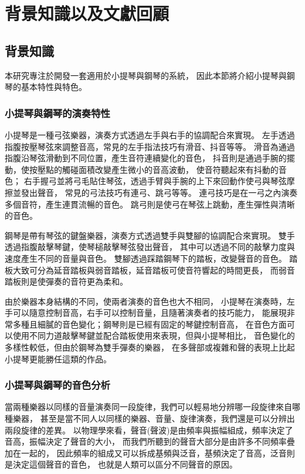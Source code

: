 \documentclass[class=NCU_thesis, crop=false]{standalone}
\begin{document}
\chapter{背景知識以及文獻回顧}

\section{背景知識}
本研究專注於開發一套適用於小提琴與鋼琴的系統，
因此本節將介紹小提琴與鋼琴的基本特性與特色。

\subsection{小提琴與鋼琴的演奏特性} \label{ch2-subst-performace-timbre-analysis}
小提琴是一種弓弦樂器，演奏方式透過左手與右手的協調配合來實現。
左手透過指腹按壓琴弦來調整音高，常見的左手指法技巧有滑音、抖音等等。
滑音為通過指腹沿琴弦滑動到不同位置，產生音符連續變化的音色，
抖音則是通過手腕的擺動，使按壓點的觸碰面積改變產生微小的音高波動，
使音符聽起來有抖動的音色；
右手握弓並將弓毛貼住琴弦，透過手臂與手腕的上下來回動作使弓與琴弦摩擦並發出聲音，
常見的弓法技巧有連弓、跳弓等等。
連弓技巧是在一弓之內演奏多個音符，產生連貫流暢的音色。
跳弓則是使弓在琴弦上跳動，產生彈性與清晰的音色。

鋼琴是帶有琴弦的鍵盤樂器，演奏方式透過雙手與雙腳的協調配合來實現。
雙手透過指腹敲擊琴鍵，使琴槌敲擊琴弦發出聲音，
其中可以透過不同的敲擊力度與速度產生不同的音量與音色。
雙腳透過踩踏鋼琴下的踏板，改變聲音的音色。
踏板大致可分為延音踏板與弱音踏板，延音踏板可使音符響起的時間更長，
而弱音踏板則是使彈奏的音符更為柔和。

由於樂器本身結構的不同，使兩者演奏的音色也大不相同，
小提琴在演奏時，左手可以隨意控制音高，右手可以控制音量，且隨著演奏者的技巧能力，
能展現非常多種且細膩的音色變化；鋼琴則是已經有固定的琴鍵控制音高，
在音色方面可以使用不同力道敲擊琴鍵並配合踏板使用來表現，但與小提琴相比，
音色變化的多樣性較低，但由於鋼琴為雙手彈奏的樂器，
在多聲部或複雜和聲的表現上比起小提琴更能勝任這類的作品。

\subsection{小提琴與鋼琴的音色分析} 
當兩種樂器以同樣的音量演奏同一段旋律，我們可以輕易地分辨哪一段旋律來自哪種樂器，
甚至是當不同人以同樣的樂器、音量、旋律演奏，我們還是可以分辨出兩段旋律的差異。
以物理學來看，聲音(聲波)是由頻率與振幅組成，頻率決定了音高，振幅決定了聲音的大小，
而我們所聽到的聲音大部分是由許多不同頻率疊加在一起的，
因此頻率的組成又可以拆成基頻與泛音，基頻決定了音高，泛音則是決定這個聲音的音色，
也就是人類可以區分不同聲音的原因。
\end{document}
